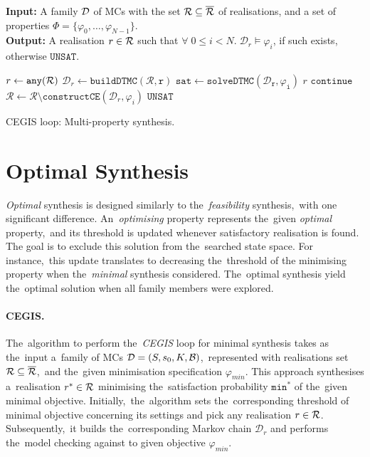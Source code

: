 \begin{algorithm}[h!]
\hspace*{\algorithmicindent} \textbf{Input:} A family $\mathcal{D}$ of MCs with the set $\mathcal{R} \subseteq \overline{\mathcal{R}}$ of realisations, and a set of properties $\varPhi = \{ \varphi_0, \dots, \varphi_{N-1} \}$. \\
\hspace*{\algorithmicindent} \textbf{Output:}  A realisation $r \in \mathcal{R}$ such that $\forall \; 0 \leq i < N. \; \mathcal{D}_r \models \varphi_i$, if such exists, otherwise $\mathtt{UNSAT}$. \\
\vspace*{-1.5em}
\begin{algorithmic}[1]
    \WHILE{$\rlz \neq \emptyset$}
        \STATE $r \leftarrow \mathtt{any(\mathcal{R})}$
        \STATE $\mathcal{D}_r\leftarrow \mathtt{buildDTMC(\mathcal{R}, r)}$
            \STATE $\mathtt{sat} \leftarrow \mathtt{solveDTMC(\mathcal{D}_r, \varphi_{i})}$
                    \RETURN $r$
                \ELSE
                    \STATE $\mathtt{continue}$
                \ENDIF
            \ELSE
                \STATE $\mathcal{R} \leftarrow \mathcal{R} \setminus \mathtt{constructCE}(\mathcal{D}_r, \varphi_{i})$
            \ENDIF
        \ENDFOR
    \ENDWHILE
    \RETURN $\mathtt{UNSAT}$
\end{algorithmic}
\caption{CEGIS loop: Multi-property synthesis.}
\label{alg:ar_optimal}
\end{algorithm}

\section{Optimal Synthesis}
\textit{Optimal} synthesis is designed similarly to the~\textit{feasibility} synthesis,~with one significant difference.
An~\textit{optimising} property represents the~given \textit{optimal} property,~and its threshold is updated whenever satisfactory realisation is found.
The goal is to exclude this solution from the~searched state space.
For instance,~this update translates to decreasing the~threshold of the minimising property when the~\textit{minimal} synthesis considered.
The~optimal synthesis yield the~optimal solution when all family members were explored.

\paragraph{CEGIS.}
The~algorithm to perform the~\textit{CEGIS} loop for minimal synthesis takes as the~input a~family of MCs $\mathcal{D} = (S,s_{0},K,\mathcal{B})$,~represented with realisations set $\mathcal{R} \subseteq \overline{\mathcal{R}}$,~and the~given minimisation specification $\varphi_{min}$.
This approach synthesises a~realisation $r^* \in \mathcal{R}$ minimising the~satisfaction probability $\mathtt{min^*}$ of the~given minimal objective.
Initially,~the~algorithm sets the~corresponding threshold of minimal objective concerning its settings and pick any realisation $r \in \mathcal{R}$.
Subsequently,~it builds the~corresponding Markov chain $\mathcal{D}_r$ and performs the~model checking against to given objective $\varphi_{min}$.


